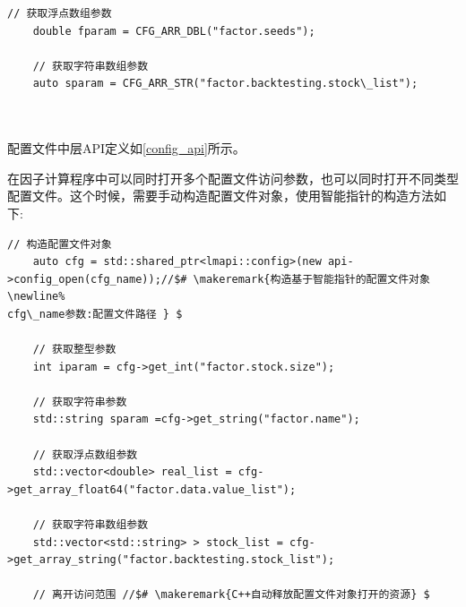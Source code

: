 \begin{lstlisting}[caption=高层API接口-获取数组参数类型,morekeywords={CFG_ARR_ARR_INT,CFG_ARR_DBL,CFG_ARR_STR}]
    // 获取浮点数组参数
    double fparam = CFG_ARR_DBL("factor.seeds");

    // 获取字符串数组参数
    auto sparam = CFG_ARR_STR("factor.backtesting.stock\_list");



\end{lstlisting}
\showremarks\hspace*{0mm}

\highlevelapiend

配置文件中层API定义如\ref{config_api}所示。



在因子计算程序中可以同时打开多个配置文件访问参数，也可以同时打开不同类型配置文件。这个时候，需要手动构造配置文件对象，使用智能指针的构造方法如下:

\begin{lstlisting}[caption=中层API接口-智能指针, morekeywords={vector,string,config_open,get_array_float64,get_int}]
    // 构造配置文件对象
    auto cfg = std::shared_ptr<lmapi::config>(new api->config_open(cfg_name));//$# \makeremark{构造基于智能指针的配置文件对象\newline%
cfg\_name参数:配置文件路径 } $

    // 获取整型参数
    int iparam = cfg->get_int("factor.stock.size");

    // 获取字符串参数
    std::string sparam =cfg->get_string("factor.name");

    // 获取浮点数组参数
    std::vector<double> real_list = cfg->get_array_float64("factor.data.value_list");

    // 获取字符串数组参数
    std::vector<std::string> > stock_list = cfg->get_array_string("factor.backtesting.stock_list");

    // 离开访问范围 //$# \makeremark{C++自动释放配置文件对象打开的资源} $

\end{lstlisting}
\showremarks\hspace*{0mm}


